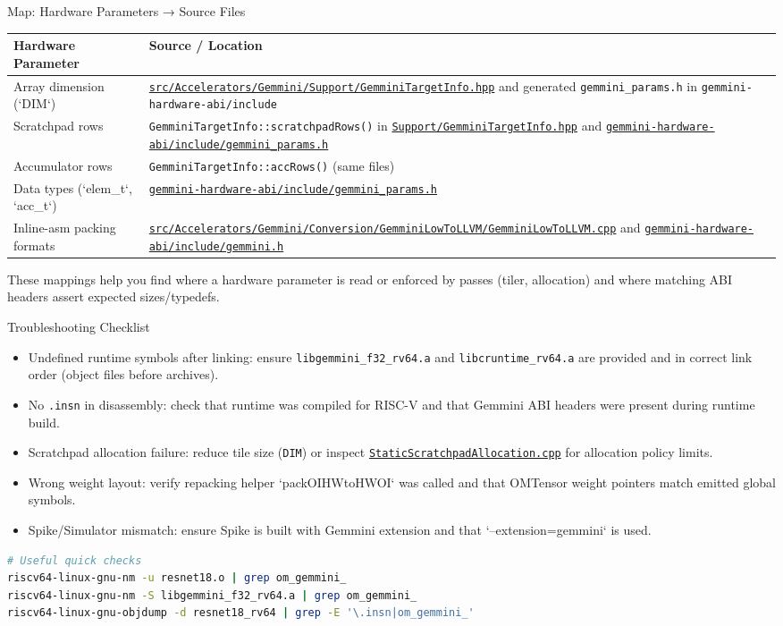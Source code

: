 \documentclass[aspectratio=169,10pt]{beamer}
\newcommand{\code}[1]{\texttt{\footnotesize #1}}
\newcommand{\repoRoot}{/home/lahcen/toolchains/onnx-mlir-xcompile/onnx-mlir}
\newcommand{\pathcode}[1]{\href{run:\repoRoot/#1}{\texttt{\scriptsize #1}}}
\begin{document}
\begin{frame}{Map: Hardware Parameters → Source Files}
  \scriptsize
  \begin{tabularx}{\textwidth}{@{}lX@{}}
    \toprule
    Hardware Parameter & Source / Location \\
    \midrule
    Array dimension (`DIM`) & \pathcode{src/Accelerators/Gemmini/Support/GemminiTargetInfo.hpp} and generated \code{gemmini_params.h} in \code{gemmini-hardware-abi/include} \\
    Scratchpad rows & \code{GemminiTargetInfo::scratchpadRows()} in \pathcode{Support/GemminiTargetInfo.hpp} and \pathcode{gemmini-hardware-abi/include/gemmini_params.h} \\
    Accumulator rows & \code{GemminiTargetInfo::accRows()} (same files) \\
    Data types (`elem_t`, `acc_t`) & \pathcode{gemmini-hardware-abi/include/gemmini_params.h} \\
    Inline-asm packing formats & \pathcode{src/Accelerators/Gemmini/Conversion/GemminiLowToLLVM/GemminiLowToLLVM.cpp} and \pathcode{gemmini-hardware-abi/include/gemmini.h} \\
    \bottomrule
  \end{tabularx}
  \vspace{0.4em}
  \tiny
  These mappings help you find where a hardware parameter is read or enforced by passes (tiler, allocation) and where matching ABI headers assert expected sizes/typedefs.
\end{frame}

\begin{frame}{Troubleshooting Checklist}
  \scriptsize
  \begin{itemize}
    \item Undefined runtime symbols after linking: ensure \code{libgemmini_f32_rv64.a} and \code{libcruntime_rv64.a} are provided and in correct link order (object files before archives).
    \item No \code{.insn} in disassembly: check that runtime was compiled for RISC-V and that Gemmini ABI headers were present during runtime build.
    \item Scratchpad allocation failure: reduce tile size (\code{DIM}) or inspect \pathcode{StaticScratchpadAllocation.cpp} for allocation policy limits.
    \item Wrong weight layout: verify repacking helper `packOIHWtoHWOI` was called and that OMTensor weight pointers match emitted global symbols.
    \item Spike/Simulator mismatch: ensure Spike is built with Gemmini extension and that `--extension=gemmini` is used.
  \end{itemize}
  \vspace{0.4em}
  \begin{lstlisting}[language=bash]
# Useful quick checks
riscv64-linux-gnu-nm -u resnet18.o | grep om_gemmini_
riscv64-linux-gnu-nm -S libgemmini_f32_rv64.a | grep om_gemmini_
riscv64-linux-gnu-objdump -d resnet18_rv64 | grep -E '\.insn|om_gemmini_'
  \end{lstlisting}
\end{frame}
\end{document}
